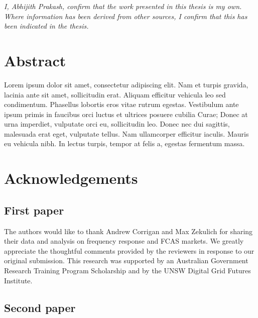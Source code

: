 \documentclass[12pt,a4paper,]{report}
\begin{document}
\vspace*{\fill}

\noindent \textit{
I, Abhijith Prakash, confirm that the work presented in this thesis is my own. Where information has been derived from other sources, I confirm that this has been indicated in the thesis.
} \vspace*{\fill}  \newpage

\hypertarget{abstract}{%
\chapter*{Abstract}\label{abstract}}

Lorem ipsum dolor sit amet, consectetur adipiscing elit. Nam et turpis
gravida, lacinia ante sit amet, sollicitudin erat. Aliquam efficitur
vehicula leo sed condimentum. Phasellus lobortis eros vitae rutrum
egestas. Vestibulum ante ipsum primis in faucibus orci luctus et
ultrices posuere cubilia Curae; Donec at urna imperdiet, vulputate orci
eu, sollicitudin leo. Donec nec dui sagittis, malesuada erat eget,
vulputate tellus. Nam ullamcorper efficitur iaculis. Mauris eu vehicula
nibh. In lectus turpis, tempor at felis a, egestas fermentum massa.

\setcounter{page}{1}

\hypertarget{acknowledgements}{%
\chapter*{Acknowledgements}\label{acknowledgements}}

\hypertarget{first-paper}{%
\section*{First paper}\label{first-paper}}

The authors would like to thank Andrew Corrigan and Max Zekulich for
sharing their data and analysis on frequency response and FCAS markets.
We greatly appreciate the thoughtful comments provided by the reviewers
in response to our original submission. This research was supported by
an Australian Government Research Training Program Scholarship and by
the UNSW Digital Grid Futures Institute.

\hypertarget{second-paper}{%
\section*{Second paper}\label{second-paper}}
\end{document}
